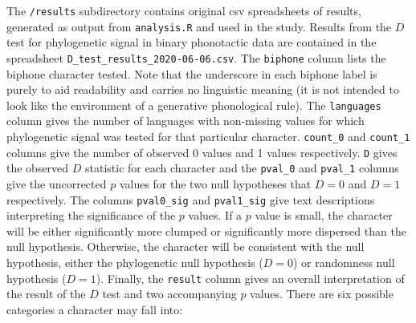 The \texttt{/results} subdirectory contains original csv spreadsheets of
results, generated as output from \texttt{analysis.R} and used in the
study. Results from the \(D\) test for phylogenetic signal in binary
phonotactic data are contained in the spreadsheet
\texttt{D\_test\_results\_2020-06-06.csv}. The \texttt{biphone} column
lists the biphone character tested. Note that the underscore in each
biphone label is purely to aid readability and carries no linguistic
meaning (it is not intended to look like the environment of a generative
phonological rule). The \texttt{languages} column gives the number of
languages with non-missing values for which phylogenetic signal was
tested for that particular character. \texttt{count\_0} and
\texttt{count\_1} columns give the number of observed 0 values and 1
values respectively. \texttt{D} gives the observed \(D\) statistic for
each character and the \texttt{pval\_0} and \texttt{pval\_1} columns
give the uncorrected \(p\) values for the two null hypotheses that
\(D = 0\) and \(D = 1\) respectively. The columns \texttt{pval0\_sig}
and \texttt{pval1\_sig} give text descriptions interpreting the
significance of the \(p\) values. If a \(p\) value is small, the
character will be either significantly more clumped or significantly
more dispersed than the null hypothesis. Otherwise, the character will
be consistent with the null hypothesis, either the phylogenetic null
hypothesis (\(D = 0\)) or randomness null hypothesis (\(D = 1\)).
Finally, the \texttt{result} column gives an overall interpretation of
the result of the \(D\) test and two accompanying \(p\) values. There
are six possible categories a character may fall into:

